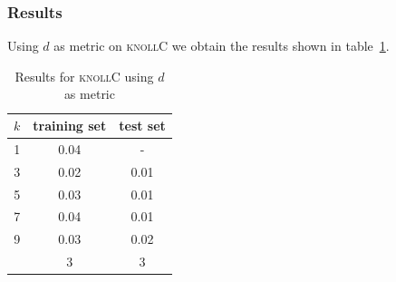 \documentclass{article}
\newcommand{\vect}[1]{\ensuremath{\boldsymbol{\mathbf{#1}}}\xspace}
\newcommand{\knollC}{\textsc{knollC}\xspace}
\begin{document}


\subsubsection{Results}
Using $d$ as metric on \knollC we obtain the results shown in table~\ref{tbl:knollCd}.

\begin{table}[h!]
  \centering
  \begin{tabular}{c | c|c }
    $k$ & training set & test set\\ \hline
    1 & 0.04 &   - \\
    3 & 0.02 & 0.01\\
    5 & 0.03 & 0.01\\ 
    7 & 0.04 & 0.01\\ 
    9 & 0.03 & 0.02 \\\hline\hline
    \hfill & 3 & 3
  \end{tabular}
  \caption{Results for \knollC using $d$ as metric}
  \label{tbl:knollCd}
\end{table}
\end{document}
